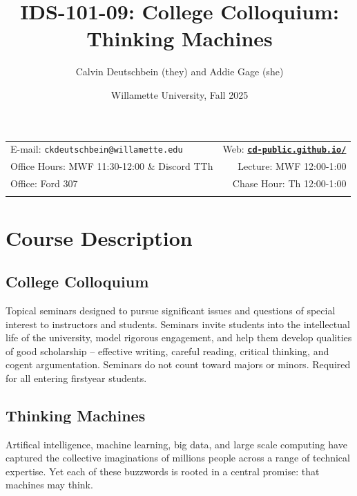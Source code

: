 \documentclass[11pt]{article}
\title{IDS-101-09: College Colloquium: Thinking Machines}
\author{Calvin Deutschbein (they) and Addie Gage (she)}
\date{Willamette University, Fall 2025}
\newcommand{\blankline}{\quad\pagebreak[2]}
\begin{document}
\maketitle

\blankline

\begin{tabular*}{.93\textwidth}{@{\extracolsep{\fill}}lr}


E-mail: \texttt{ckdeutschbein@willamette.edu} & Web: \href{https://cd-public.github.io/courses/soc}{\tt\bf cd-public.github.io/}  \\

 Office Hours: MWF 11:30-12:00 \& Discord TTh  &  Lecture: MWF 12:00-1:00 \\

 Office: Ford 307 & Chase Hour: Th 12:00-1:00  \\
 & \\
\hline
\end{tabular*}

\vspace{5 mm}


\section*{Course Description}

\subsection*{College Colloquium}

Topical seminars designed to pursue significant issues and questions of special interest to instructors and students. Seminars invite students into the intellectual life of the university, model rigorous engagement, and help them develop qualities of good scholarship -- effective writing, careful reading, critical thinking, and cogent argumentation. Seminars do not count toward majors or minors. Required for all entering firstyear students.

\subsection*{Thinking Machines}

Artifical intelligence, machine learning, big data, and large scale computing have captured the collective imaginations of millions people across a range of technical expertise. Yet each of these buzzwords is rooted in a central promise: that machines may think.
\end{document}
